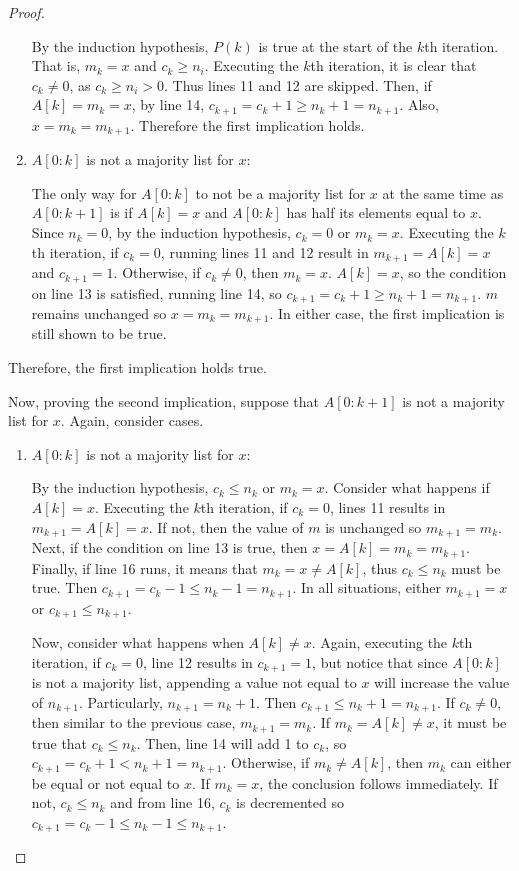 \documentclass[11pt]{article}
\begin{document}
\begin{proof}
\begin{enumerate}
            By the induction hypothesis, \(P(k)\) is true at the start of the \(k\)th iteration. That is, \(m_k = x\) and \(c_k \geq n_i\). Executing the \(k\)th iteration, it is clear that \(c_k \neq 0\), as \(c_k \geq n_i > 0\). Thus lines 11 and 12 are skipped. Then, if \(A[k]=m_k = x\), by line 14, \(c_{k+1} = c_k + 1 \geq n_k + 1 = n_{k+1}\). Also, \(x=m_k=m_{k+1}\). Therefore the first implication holds.

            \item \(A[0:k]\) is not a majority list for \(x\):
            
            The only way for \(A[0:k]\) to not be a majority list for \(x\) at the same time as \(A[0:k+1]\) is if \(A[k]=x\) and \(A[0:k]\) has half its elements equal to \(x\). Since \(n_k=0\), by the induction hypothesis, \(c_k = 0\) or \(m_k=x\). Executing the \(k\)th iteration, if \(c_k=0\), running lines 11 and 12 result in \(m_{k+1} = A[k] = x\) and \(c_{k+1} = 1\). Otherwise, if \(c_k \neq 0\), then \(m_k=x\). \(A[k]=x\), so the condition on line 13 is satisfied, running line 14, so \(c_{k+1} = c_k + 1 \geq n_k + 1 = n_{k+1}\). \(m\) remains unchanged so \(x=m_k=m_{k+1}\). In either case, the first implication is still shown to be true.
        \end{enumerate}
        Therefore, the first implication holds true.

        Now, proving the second implication, suppose that \(A[0:k+1]\) is not a majority list for \(x\). Again, consider cases.
        \begin{enumerate}
            \item \(A[0:k]\) is not a majority list for \(x\):
            
            By the induction hypothesis, \(c_k \leq n_k\) or \(m_k = x\). Consider what happens if \(A[k]= x\). Executing the \(k\)th iteration, if \(c_k=0\), lines 11 results in \(m_{k+1} = A[k]= x\). If not, then the value of \(m\) is unchanged so \(m_{k+1} = m_k\). Next, if the condition on line 13 is true, then \(x = A[k]= m_k= m_{k+1}\). Finally, if line 16 runs, it means that \(m_k = x \neq A[k]\), thus \(c_k \leq n_k\) must be true. Then \(c_{k+1} = c_k - 1 \leq n_k - 1 = n_{k+1}\). In all situations, either \(m_{k+1} = x\) or \(c_{k+1} \leq n_{k+1}\).

            Now, consider what happens when \(A[k]\neq x\). Again, executing the \(k\)th iteration, if \(c_k = 0\), line 12 results in \(c_{k+1} = 1\), but notice that since \(A[0:k]\) is not a majority list, appending a value not equal to \(x\) will increase the value of \(n_{k+1}\). Particularly, \(n_{k+1} = n_k + 1\). Then \(c_{k+1} \leq n_k + 1 = n_{k+1}\). If \(c_k \neq 0\), then similar to the previous case, \(m_{k+1} = m_k\). If \(m_k = A[k] \neq x\), it must be true that \(c_k \leq n_k\). Then, line 14 will add 1 to \(c_k\), so \(c_{k+1} = c_k + 1 < n_k + 1 = n_{k+1}\). Otherwise, if \(m_k \neq A[k]\), then \(m_k\) can either be equal or not equal to \(x\). If \(m_k = x\), the conclusion follows immediately. If not, \(c_k \leq n_k\) and from line 16, \(c_k\) is decremented so \(c_{k+1} = c_k - 1 \leq n_k - 1 \leq n_{k+1}\).


\end{enumerate}
\end{proof}
\end{document}
